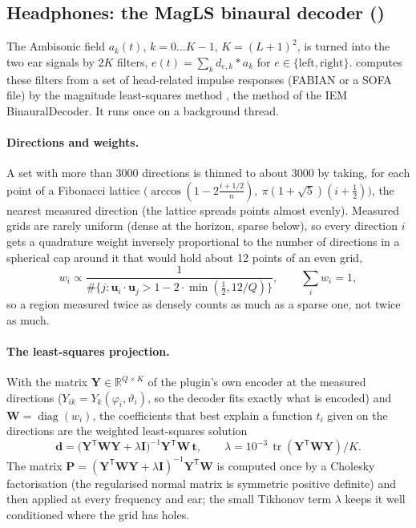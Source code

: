 \subsection{Headphones: the MagLS binaural decoder ()}
\label{sec:math-binaural}
The Ambisonic field $a_k(t)$, $k = 0\dots K-1$, $K=(L+1)^2$, is turned into the two ear signals by $2K$ filters,
$e(t) = \sum_k d_{e,k} * a_k$ for $e\in\{\text{left},\text{right}\}$.  computes these
filters from a set of head-related impulse responses (FABIAN or a SOFA file) by the magnitude least-squares method
\citep{schoerkhuber2018magls}, the method of the IEM BinauralDecoder. It runs once on a background thread.

\paragraph{Directions and weights.} A set with more than 3000 directions is thinned to about 3000 by taking, for each
point of a Fibonacci lattice $\bigl(\arccos(1 - 2\frac{i+1/2}{n}),\ \pi(1+\sqrt5)(i+\frac12)\bigr)$, the nearest
measured direction (the lattice spreads points almost evenly). Measured grids are rarely uniform (dense at the
horizon, sparse below), so every direction $i$ gets a quadrature weight inversely proportional to the number of
directions in a spherical cap around it that would hold about 12 points of an even grid,
\begin{equation}
  w_i \propto \frac{1}{\#\{j : \mathbf u_i\cdot\mathbf u_j > 1 - 2\cdot\min(\tfrac12, 12/Q)\}},\qquad \sum_i w_i = 1,
\end{equation}
so a region measured twice as densely counts as much as a sparse one, not twice as much.

\paragraph{The least-squares projection.} With the matrix $\mathbf Y\in\mathbb R^{Q\times K}$ of the plugin's own
encoder at the measured directions ($Y_{ik} = Y_k(\varphi_i,\vartheta_i)$, so the decoder fits exactly what is
encoded) and $\mathbf W = \operatorname{diag}(w_i)$, the coefficients that best explain a function $t_i$ given on the
directions are the weighted least-squares solution
\begin{equation}
  \mathbf d = \bigl(\mathbf Y^{\mathsf T}\mathbf W\mathbf Y + \lambda\mathbf I\bigr)^{-1}\mathbf Y^{\mathsf T}\mathbf W\,\mathbf t,
  \qquad \lambda = 10^{-3}\,\operatorname{tr}(\mathbf Y^{\mathsf T}\mathbf W\mathbf Y)/K .
\end{equation}
The matrix $\mathbf P = (\mathbf Y^{\mathsf T}\mathbf W\mathbf Y+\lambda\mathbf I)^{-1}\mathbf Y^{\mathsf T}\mathbf W$ is
computed once by a Cholesky factorisation (the regularised normal matrix is symmetric positive definite) and then
applied at every frequency and ear; the small Tikhonov term $\lambda$ keeps it well conditioned where the grid has
holes.

